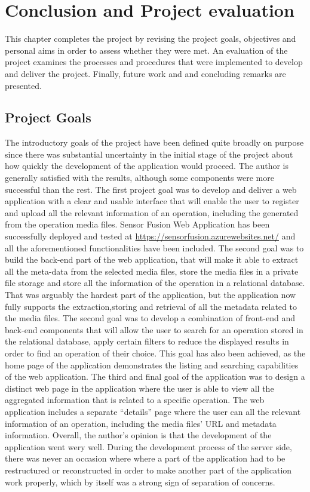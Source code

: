 \chapter{Conclusion and Project evaluation}
\label{chapterlabel7}

This chapter completes the project by revising the project goals, objectives and personal aims in order to assess whether they were met. An evaluation of the project examines the processes and procedures that were implemented to develop and deliver the project. Finally, future work and and concluding remarks are presented.

\section{Project Goals}

The introductory goals of the project have been defined quite broadly on purpose since there was substantial uncertainty  in the initial stage of the project about how quickly the development of the application would proceed. The author is generally satisfied with the results, although some components were more successful than the rest. The first project goal was to develop and deliver a web application with a clear and usable interface that will enable the user to register and upload all the relevant information of an operation, including the generated from the operation media files. Sensor Fusion Web Application has been successfully deployed and tested at \url{https://sensorfusion.azurewebsites.net/} and all the aforementioned functionalities have been included. The second goal was to build the back-end part of the web application, that will make it able to extract all the meta-data from the selected media files, store the media files in a private file storage and store all the information of the operation in a relational database. That was arguably the hardest part of the application, but the application now fully supports the extraction,storing and retrieval of all the metadata related to the media files. The second goal was to develop a combination of front-end and back-end components that will allow the user to search for an operation stored in the relational database, apply certain filters to reduce the displayed results in order to find an operation of their choice. This goal has also been achieved, as the home page of the application demonstrates the listing and searching capabilities of the web application. The third and final goal of the application was to design a distinct web page in the application where the user is able to view all the aggregated information that is related to a specific operation. The web application includes a separate ``details'' page where the user can all the relevant information of an operation, including the media files' URL and metadata information. Overall, the author's opinion is that the development of the application went wery well. During the development process of the server side, there was never an occasion where where a part of the application had to be restructured or reconstructed in order to make another part of the application work properly, which by itself was a strong sign of separation of concerns.

